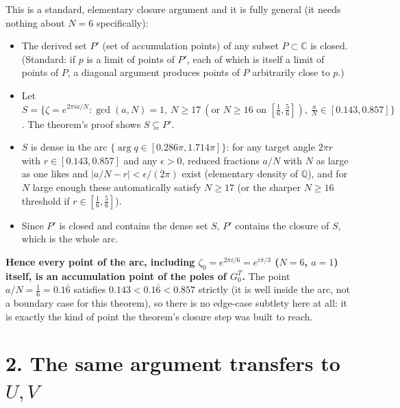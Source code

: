 \documentclass[11pt]{article}
\begin{document}
This is a standard, elementary closure argument and it is fully general (it needs nothing about
$N=6$ specifically):
\begin{itemize}
\item The derived set $P'$ (set of accumulation points) of any subset $P\subset\mathbb C$ is closed.
(Standard: if $p$ is a limit of points of $P'$, each of which is itself a limit of points of $P$,
a diagonal argument produces points of $P$ arbitrarily close to $p$.)
\item Let $S=\{\zeta=e^{2\pi ia/N}:\gcd(a,N)=1,\ N\ge17\ (\text{or }N\ge16\text{ on }[\tfrac16,
\tfrac56]),\ \tfrac aN\in[0.143,0.857]\}$. The theorem's proof shows $S\subseteq P'$.
\item $S$ is dense in the arc $\{\arg q\in[0.286\pi,1.714\pi]\}$: for any target angle
$2\pi r$ with $r\in[0.143,0.857]$ and any $\epsilon>0$, reduced fractions $a/N$ with $N$ as large as
one likes and $|a/N-r|<\epsilon/(2\pi)$ exist (elementary density of $\mathbb Q$), and for $N$ large
enough these automatically satisfy $N\ge17$ (or the sharper $N\ge16$ threshold if $r\in[\frac16,
\frac56]$).
\item Since $P'$ is closed and contains the dense set $S$, $P'$ contains the closure of $S$, which
is the whole arc.
\end{itemize}
\textbf{Hence every point of the arc, including $\zeta_0=e^{2\pi i/6}=e^{i\pi/3}$ ($N=6$, $a=1$)
itself, is an accumulation point of the poles of $G^T_0$.} The point $a/N=\frac16=0.1\overline6$
satisfies $0.143<0.1\overline6<0.857$ strictly (it is well inside the arc, not a boundary case for
this theorem), so there is no edge-case subtlety here at all: it is exactly the kind of point the
theorem's closure step was built to reach.

\section*{2. The same argument transfers to $U,V$}
\end{document}
